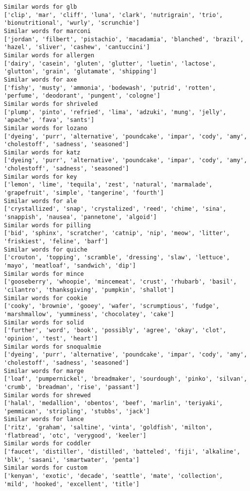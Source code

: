 \documentclass[11pt]{article}
\begin{document}
\begin{Verbatim}[commandchars=\\\{\}]
Similar words for glb
['clip', 'mar', 'cliff', 'luna', 'clark', 'nutrigrain', 'trio', 'bionutritional', 'wurly', 'scrunchie']
Similar words for marconi
['jordan', 'filbert', 'pistachio', 'macadamia', 'blanched', 'brazil', 'hazel', 'sliver', 'cashew', 'cantuccini']
Similar words for allergen
['dairy', 'casein', 'gluten', 'glutter', 'luetin', 'lactose', 'glutton', 'grain', 'glutamate', 'shipping']
Similar words for axe
['fishy', 'musty', 'ammonia', 'bodewash', 'putrid', 'rotten', 'perfume', 'deodorant', 'pungent', 'cologne']
Similar words for shriveled
['plump', 'pinto', 'refried', 'lima', 'adzuki', 'mung', 'jelly', 'apache', 'fava', 'sants']
Similar words for lozano
['dyeing', 'purr', 'alternative', 'poundcake', 'impar', 'cody', 'amy', 'cholestoff', 'sadness', 'seasoned']
Similar words for katz
['dyeing', 'purr', 'alternative', 'poundcake', 'impar', 'cody', 'amy', 'cholestoff', 'sadness', 'seasoned']
Similar words for key
['lemon', 'lime', 'tequila', 'zest', 'natural', 'marmalade', 'grapefruit', 'simple', 'tangerine', 'fourth']
Similar words for ale
['crystallized', 'snap', 'crystalized', 'reed', 'chime', 'sina', 'snappish', 'nausea', 'pannetone', 'algoid']
Similar words for pilling
['bid', 'sphinx', 'scratcher', 'catnip', 'nip', 'meow', 'litter', 'friskiest', 'feline', 'barf']
Similar words for quiche
['crouton', 'topping', 'scramble', 'dressing', 'slaw', 'lettuce', 'mayo', 'meatloaf', 'sandwich', 'dip']
Similar words for mince
['gooseberry', 'whoopie', 'mincemeat', 'crust', 'rhubarb', 'basil', 'cilantro', 'thanksgiving', 'pumpkin', 'shallot']
Similar words for cookie
['cooky', 'brownie', 'gooey', 'wafer', 'scrumptious', 'fudge', 'marshmallow', 'yumminess', 'chocolatey', 'cake']
Similar words for solid
['further', 'word', 'book', 'possibly', 'agree', 'okay', 'clot', 'opinion', 'test', 'heart']
Similar words for snoqualmie
['dyeing', 'purr', 'alternative', 'poundcake', 'impar', 'cody', 'amy', 'cholestoff', 'sadness', 'seasoned']
Similar words for marge
['loaf', 'pumpernickel', 'breadmaker', 'sourdough', 'pinko', 'silvan', 'crumb', 'breadman', 'rise', 'passant']
Similar words for shrewed
['halal', 'medallion', 'obentos', 'beef', 'marlin', 'teriyaki', 'pemmican', 'stripling', 'stubbs', 'jack']
Similar words for lance
['ritz', 'graham', 'saltine', 'vinta', 'goldfish', 'milton', 'flatbread', 'otc', 'verygood', 'keeler']
Similar words for coddler
['faucet', 'distiller', 'distilled', 'batteled', 'fiji', 'alkaline', 'blk', 'sasani', 'smartwater', 'penta']
Similar words for custom
['kenyan', 'exotic', 'decade', 'seattle', 'mate', 'collection', 'mild', 'hooked', 'excellent', 'title']

\end{Verbatim}
\end{document}
